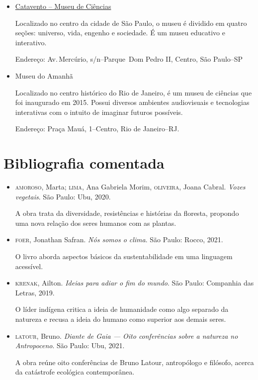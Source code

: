 \documentclass[11pt]{extarticle}
\begin{document}
\begin{itemize}

\item \href{https://museucatavento.org.br/}{Catavento – Museu de Ciências}

Localizado no centro da cidade de São Paulo, o museu é dividido em quatro seções: universo, vida, engenho e sociedade. É um museu educativo e interativo.

Endereço: Av.\,Mercúrio, s/n--Parque \,Dom Pedro II, Centro, São Paulo--SP

\item {Museu do Amanhã}

Localizado no centro histórico do Rio de Janeiro, é um museu de ciências que foi inaugurado em 2015. Possui diversos ambientes audiovisuais e tecnologias interativas com o intuito de imaginar futuros possíveis.

Endereço: Praça Mauá, 1--Centro, Rio de Janeiro--RJ.

\end{itemize}

\section{Bibliografia comentada}

\begin{itemize}

\item \textsc{amoroso}, Marta; \textsc{lima}, Ana Gabriela Morim, \textsc{oliveira}, Joana Cabral. \textit{Vozes vegetais}. São Paulo: Ubu, 2020.

A obra trata da diversidade, resistências e histórias da floresta, propondo uma nova relação dos seres humanos com as plantas.

\item \textsc{foer}, Jonathan Safran. \textit{Nós somos o clima}. São Paulo: Rocco, 2021.

O livro aborda aspectos básicos da sustentabilidade em uma linguagem acessível.

\item \textsc{krenak}, Ailton. \textit{Ideias para adiar o fim do mundo}. São Paulo:
Companhia das Letras, 2019.

O líder indígena critica a ideia de humanidade como algo separado da natureza e recusa a ideia do humano como superior aos demais seres.

\item \textsc{latour}, Bruno. \textit{Diante de Gaia --- Oito conferências sobre a natureza no Antropoceno}. São Paulo: Ubu, 2021.

A obra reúne oito conferências de Bruno Latour, antropólogo e filósofo, acerca da catástrofe ecológica contemporânea.

\end{itemize}
\end{document}
